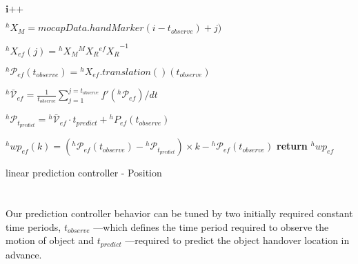 \documentclass{article}
\begin{document}
\newpage

\begin{algorithm}[H] \label{positionalgo}
	\DontPrintSemicolon
	
	
	
	\textit{$\textbf{i++}$} 
	
	{		
		{
			${}^{h}{X}_M= \textit{mocapData}.handMarker(i-t_{observe})+j)$	
			
			${}^{h}{X}_{ef}(j) =  {}^{h}{X}_M  {}^{M}{X}_R {{}^{ef}{X}_R}^{-1}$	
			
			{
				${}^{h}\mathcal{P}_{ef}(t_{observe}) = \mathcal{}^{h}{X}_{ef}.translation()(t_{observe}) $
			}
		}
		
		${}^{h}\mathcal{\bar{V}}_{ef} = \frac{1}{t_{observe}}{\sum_{j=1}^{j=t_{observe}} f'({}^{h}\mathcal{P}_{ef})/dt }$\newline 
		
		
		${}^{h}\mathcal{P}_{t_{predict}} = {}^{h}\mathcal{\bar{V}}_{ef} \cdot t_{predict}  + {}^{h}P_{ef}(t_{observe})$ \newline %
		
		{
			{
				${}^{h}wp_{ef}(k) = ( {}^{h}\mathcal{P}_{ef}(t_{observe}) - {}^{h}\mathcal{P}_{t_{predict}}  ) \times k  -  {}^{h}\mathcal{P}_{ef}(t_{observe}) $ 
			}	
			\textbf{return} $ {}^{h}wp_{ef} $
		}
	}
	\caption{linear prediction controller - Position}
\end{algorithm}

\newpage


\section*{}
Our prediction controller behavior can be tuned by two initially required constant time periods, $t_{observe}$ ---which defines the time period required to observe the motion of object and $t_{predict}$ ---required to predict the object handover location in advance.
\end{document}
